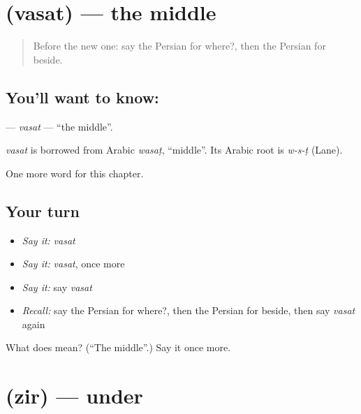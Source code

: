 \section[\texorpdfstring{\fa{وسط} (vasat)}{وسط (vasat)}]{ (vasat) — the middle}

\label{lesson:FA-C85-vasat}



\begin{quote}
Before the new one: say the Persian for where?, then the Persian for beside.
\end{quote}

\subsection*{You'll want to know: }
\textbf{} — \emph{vasat} — \textquotedblleft{}the middle\textquotedblright{}.

\begin{cousinweb}
\emph{vasat} is borrowed from Arabic \emph{wasaṭ}, \textquotedblleft{}middle\textquotedblright{}. Its Arabic root is \emph{w-s-ṭ} (Lane).
\end{cousinweb}

\begin{grammarlens}[title={What you've built}]
One more word for this chapter.
\end{grammarlens}

\subsection*{Your turn}
\begin{itemize}
\raggedright
  \item \emph{Say it:} \emph{vasat}
  \item \emph{Say it:} \emph{vasat}, once more
  \item \emph{Say it:} say \emph{vasat}
  \item \emph{Recall:} say the Persian for where?, then the Persian for beside, then say \emph{vasat} again
\end{itemize}

\begin{tcolorbox}[breakable,colback=teal!4,colframe=teal!35!black,title={Before you move on}]
What does  mean? (\textquotedblleft{}The middle\textquotedblright{}.) Say it once more.
\end{tcolorbox}
\section[\texorpdfstring{\fa{زیر} (zir)}{زیر (zir)}]{ (zir) — under}

